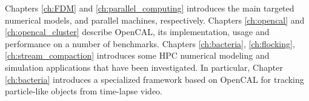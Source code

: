 Chapters \ref{ch:FDM} and \ref{ch:parallel_computing} introduces the main targeted numerical models, and parallel machines, respectively.
Chapters \ref{ch:opencal} and \ref{ch:opencal_cluster} describe OpenCAL, its implementation, usage and performance on a number of benchmarks.
Chapters \ref{ch:bacteria}, \ref{ch:flocking}, \ref{ch:stream_compaction} introduces some HPC numerical modeling and simulation applications that have been investigated.
In particular, Chapter \ref{ch:bacteria} introduces a specialized framework based on OpenCAL for tracking particle-like objects from time-lapse video.



